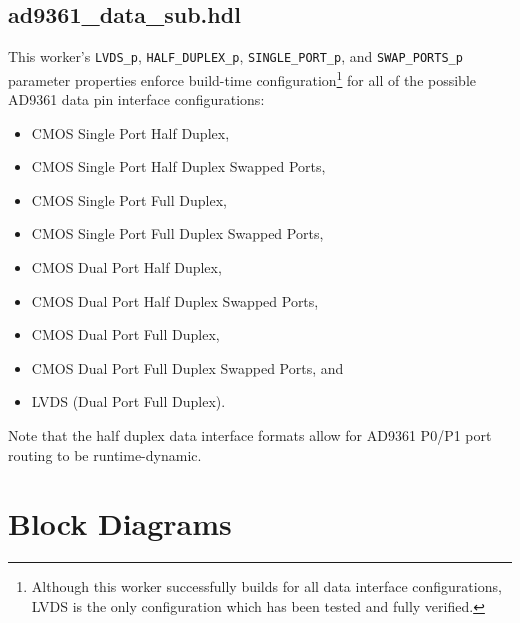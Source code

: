 \documentclass{article}
\def\comp{ad9361\_data\_sub}
\begin{document}
\subsection*{\comp.hdl}
\begin{sloppypar}
This worker's \verb+LVDS_p+, \verb+HALF_DUPLEX_p+, \verb+SINGLE_PORT_p+, and \verb+SWAP_PORTS_p+ parameter properties enforce build-time configuration\footnote{Although this worker successfully builds for all data interface configurations, LVDS is the only configuration which has been tested and fully verified.} for all of the possible AD9361 data pin interface configurations\cite{adi_ug570}:
\begin{itemize}
	\item CMOS Single Port Half Duplex,
	\item CMOS Single Port Half Duplex Swapped Ports,
	\item CMOS Single Port Full Duplex,
	\item CMOS Single Port Full Duplex Swapped Ports,
	\item CMOS Dual Port Half Duplex,
	\item CMOS Dual Port Half Duplex Swapped Ports,
	\item CMOS Dual Port Full Duplex,
	\item CMOS Dual Port Full Duplex Swapped Ports, and
	\item LVDS (Dual Port Full Duplex).
\end{itemize}
\end{sloppypar}
\noindent
Note that the half duplex data interface formats allow for AD9361 P0/P1 port routing to be runtime-dynamic.
\pagebreak

\section*{Block Diagrams}
\end{document}
